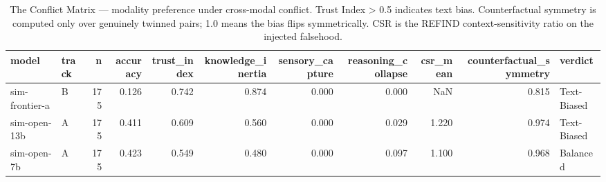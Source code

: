 \begin{table}[t]
\centering
\small
\begin{tabular}{llrrrrrrrrl}
\toprule
model & track & n & accuracy & trust\_index & knowledge\_inertia & sensory\_capture & reasoning\_collapse & csr\_mean & counterfactual\_symmetry & verdict \\
\midrule
sim-frontier-a & B & 175 & 0.126 & 0.742 & 0.874 & 0.000 & 0.000 & NaN & 0.815 & Text-Biased \\
sim-open-13b & A & 175 & 0.411 & 0.609 & 0.560 & 0.000 & 0.029 & 1.220 & 0.974 & Text-Biased \\
sim-open-7b & A & 175 & 0.423 & 0.549 & 0.480 & 0.000 & 0.097 & 1.100 & 0.968 & Balanced \\
\bottomrule
\end{tabular}
\caption{The Conflict Matrix — modality preference under cross-modal conflict. Trust Index > 0.5 indicates text bias. Counterfactual symmetry is computed only over genuinely twinned pairs; 1.0 means the bias flips symmetrically. CSR is the REFIND context-sensitivity ratio on the injected falsehood.}
\end{table}
